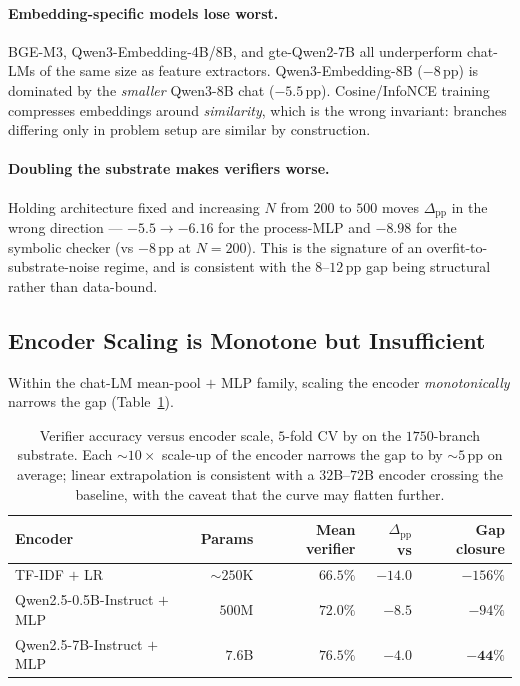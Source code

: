 \paragraph{Embedding-specific models lose worst.}
BGE-M3, Qwen3-Embedding-4B/8B, and gte-Qwen2-7B all underperform
chat-LMs of the same size as feature extractors.  Qwen3-Embedding-8B
($-8$\,pp) is dominated by the \emph{smaller} Qwen3-8B chat
($-5.5$\,pp).  Cosine/InfoNCE training compresses embeddings around
\emph{similarity}, which is the wrong invariant: branches differing
only in problem setup are similar by construction.

\paragraph{Doubling the substrate makes verifiers worse.}
Holding architecture fixed and increasing $N$ from $200$ to $500$
moves $\Delta_\text{pp}$ in the wrong direction --- $-5.5 \to -6.16$
for the process-MLP and $-8.98$ for the symbolic checker (vs
$-8$\,pp at $N{=}200$).  This is the signature of an
overfit-to-substrate-noise regime, and is consistent with the
$8\text{--}12$\,pp gap being structural rather than data-bound.

\subsection{Encoder Scaling is Monotone but Insufficient}
\label{subsec:encoder_scaling}

Within the chat-LM mean-pool $+$ MLP family, scaling the encoder
\emph{monotonically} narrows the gap (Table~\ref{tab:encoder_scaling}).

\begin{table}[h]
\centering
\caption{Verifier accuracy versus encoder scale, $5$-fold CV by
 on the $1750$-branch \cmaj{} substrate.  Each
$\sim 10\times$ scale-up of the encoder narrows the gap to \cmaj{}
by $\sim 5$\,pp on average; linear extrapolation is consistent with
a $32$B$\text{--}72$B encoder crossing the \cmaj{} baseline, with
the caveat that the curve may flatten further.}
\label{tab:encoder_scaling}
\smallskip
\small
\begin{tabular}{lrrrr}
\toprule
Encoder & Params & Mean verifier & $\Delta_\text{pp}$ vs \cmaj{} & Gap closure \\
\midrule
TF-IDF $+$ LR & $\sim 250$K & $66.5\%$ & $-14.0$ & $-156\%$ \\
Qwen2.5-0.5B-Instruct $+$ MLP & $500$M & $72.0\%$ & $-8.5$ & $-94\%$ \\
Qwen2.5-7B-Instruct $+$ MLP & $7.6$B & $\mathbf{76.5\%}$ & $\mathbf{-4.0}$ & $\mathbf{-44\%}$ \\
\bottomrule
\end{tabular}
\normalsize
\end{table}

